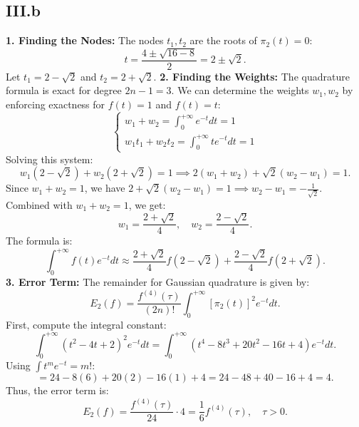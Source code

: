 \documentclass[a4paper]{article}
\begin{document}
\subsection*{III.b }
\textbf{1. Finding the Nodes:}
The nodes $t_1, t_2$ are the roots of $\pi_2(t) = 0$:
\[
t = \frac{4 \pm \sqrt{16 - 8}}{2} = 2 \pm \sqrt{2}.
\]
Let $t_1 = 2 - \sqrt{2}$ and $t_2 = 2 + \sqrt{2}$.\newline
\textbf{2. Finding the Weights:}
The quadrature formula is exact for degree $2n-1 = 3$. We can determine the weights $w_1, w_2$ by enforcing exactness for $f(t) = 1$ and $f(t) = t$:
\[
\begin{cases}
w_1 + w_2 = \int_{0}^{+\infty} e^{-t} dt = 1 \\
w_1 t_1 + w_2 t_2 = \int_{0}^{+\infty} t e^{-t} dt = 1
\end{cases}
\]
Solving this system:
\[
w_1 (2-\sqrt{2}) + w_2 (2+\sqrt{2}) = 1 \implies 2(w_1+w_2) + \sqrt{2}(w_2-w_1) = 1.
\]
Since $w_1+w_2=1$, we have $2 + \sqrt{2}(w_2-w_1) = 1 \implies w_2 - w_1 = -\frac{1}{\sqrt{2}}$.
Combined with $w_1+w_2=1$, we get:
\[
w_1 = \frac{2+\sqrt{2}}{4}, \quad w_2 = \frac{2-\sqrt{2}}{4}.
\]
The formula is:
\[
\int_{0}^{+\infty} f(t)e^{-t} dt \approx \frac{2+\sqrt{2}}{4} f(2-\sqrt{2}) + \frac{2-\sqrt{2}}{4} f(2+\sqrt{2}).
\]
\textbf{3. Error Term:}
The remainder for Gaussian quadrature is given by:
\[
E_2(f) = \frac{f^{(4)}(\tau)}{(2n)!} \int_{0}^{+\infty} [\pi_2(t)]^2 e^{-t} dt.
\]
First, compute the integral constant:
\[
\int_{0}^{+\infty} (t^2 - 4t + 2)^2 e^{-t} dt = \int_{0}^{+\infty} (t^4 - 8t^3 + 20t^2 - 16t + 4) e^{-t} dt.
\]
Using $\int t^m e^{-t} = m!$:
\[
= 24 - 8(6) + 20(2) - 16(1) + 4 = 24 - 48 + 40 - 16 + 4 = 4.
\]
Thus, the error term is:
\[
E_2(f) = \frac{f^{(4)}(\tau)}{24} \cdot 4 = \frac{1}{6} f^{(4)}(\tau), \quad \tau > 0.
\]
\end{document}
